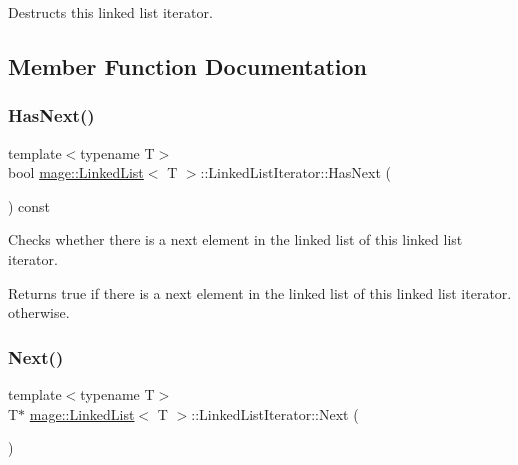 Destructs this linked list iterator. 

\subsection{Member Function Documentation}
\hypertarget{structmage_1_1_linked_list_1_1_linked_list_iterator_ae23127f7be560d81bbda5321690a7ef9}{}\label{structmage_1_1_linked_list_1_1_linked_list_iterator_ae23127f7be560d81bbda5321690a7ef9} 
\subsubsection{\texorpdfstring{Has\+Next()}{HasNext()}}
{\footnotesize\ttfamily template$<$typename T$>$ \\
bool \hyperlink{classmage_1_1_linked_list}{mage\+::\+Linked\+List}$<$ T $>$\+::Linked\+List\+Iterator\+::\+Has\+Next (\begin{DoxyParamCaption}{ }\end{DoxyParamCaption}) const}

Checks whether there is a next element in the linked list of this linked list iterator.

\begin{DoxyReturn}{Returns}
{\ttfamily true} if there is a next element in the linked list of this linked list iterator.  otherwise. 
\end{DoxyReturn}
\hypertarget{structmage_1_1_linked_list_1_1_linked_list_iterator_aaffb4ff395841103f65d09b2784ad61f}{}\label{structmage_1_1_linked_list_1_1_linked_list_iterator_aaffb4ff395841103f65d09b2784ad61f} 
\subsubsection{\texorpdfstring{Next()}{Next()}}
{\footnotesize\ttfamily template$<$typename T$>$ \\
T$\ast$ \hyperlink{classmage_1_1_linked_list}{mage\+::\+Linked\+List}$<$ T $>$\+::Linked\+List\+Iterator\+::\+Next (\begin{DoxyParamCaption}{ }\end{DoxyParamCaption})}

